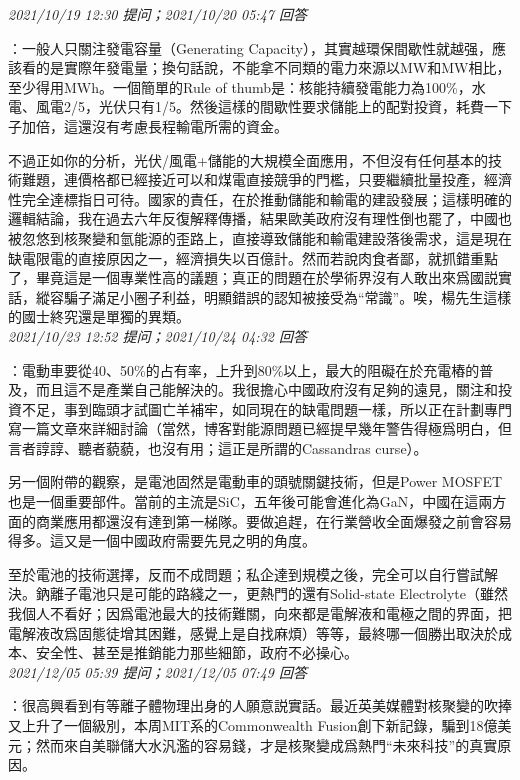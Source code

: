 \documentclass[twocolumn]{ctexart}
\begin{document}
\textit{\hfill\noindent\small 2021/10/19 12:30 提问；2021/10/20 05:47 回答}

：一般人只關注發電容量（Generating Capacity），其實越環保間歇性就越强，應該看的是實際年發電量；換句話說，不能拿不同類的電力來源以MW和MW相比，至少得用MWh。一個簡單的Rule of thumb是：核能持續發電能力為100\%，水電、風電2/5，光伏只有1/5。然後這樣的間歇性要求儲能上的配對投資，耗費一下子加倍，這還沒有考慮長程輸電所需的資金。

不過正如你的分析，光伏/風電+儲能的大規模全面應用，不但沒有任何基本的技術難題，連價格都已經接近可以和煤電直接競爭的門檻，只要繼續批量投產，經濟性完全達標指日可待。國家的責任，在於推動儲能和輸電的建設發展；這樣明確的邏輯結論，我在過去六年反復解釋傳播，結果歐美政府沒有理性倒也罷了，中國也被忽悠到核聚變和氫能源的歪路上，直接導致儲能和輸電建設落後需求，這是現在缺電限電的直接原因之一，經濟損失以百億計。然而若說肉食者鄙，就抓錯重點了，畢竟這是一個專業性高的議題；真正的問題在於學術界沒有人敢出來爲國説實話，縱容騙子滿足小圈子利益，明顯錯誤的認知被接受為“常識”。唉，楊先生這樣的國士終究還是單獨的異類。
\\

\textit{\hfill\noindent\small 2021/10/23 12:52 提问；2021/10/24 04:32 回答}

：電動車要從40、50\%的占有率，上升到80\%以上，最大的阻礙在於充電樁的普及，而且這不是產業自己能解決的。我很擔心中國政府沒有足夠的遠見，關注和投資不足，事到臨頭才試圖亡羊補牢，如同現在的缺電問題一樣，所以正在計劃專門寫一篇文章來詳細討論（當然，博客對能源問題已經提早幾年警告得極爲明白，但言者諄諄、聽者藐藐，也沒有用；這正是所謂的Cassandras curse）。

另一個附帶的觀察，是電池固然是電動車的頭號關鍵技術，但是Power MOSFET也是一個重要部件。當前的主流是SiC，五年後可能會進化為GaN，中國在這兩方面的商業應用都還沒有達到第一梯隊。要做追趕，在行業營收全面爆發之前會容易得多。這又是一個中國政府需要先見之明的角度。

至於電池的技術選擇，反而不成問題；私企達到規模之後，完全可以自行嘗試解決。鈉離子電池只是可能的路綫之一，更熱門的還有Solid-state Electrolyte（雖然我個人不看好；因爲電池最大的技術難關，向來都是電解液和電極之間的界面，把電解液改爲固態徒增其困難，感覺上是自找麻煩）等等，最終哪一個勝出取決於成本、安全性、甚至是推銷能力那些細節，政府不必操心。
\\

\textit{\hfill\noindent\small 2021/12/05 05:39 提问；2021/12/05 07:49 回答}

：很高興看到有等離子體物理出身的人願意説實話。最近英美媒體對核聚變的吹捧又上升了一個級別，本周MIT系的Commonwealth Fusion創下新記錄，騙到18億美元；然而來自美聯儲大水汎濫的容易錢，才是核聚變成爲熱門“未來科技”的真實原因。
\end{document}
